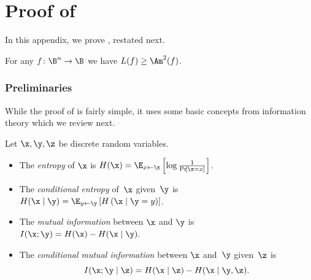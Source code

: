 \documentclass{toc}
\begin{document}
\appendix

\section{\label{sec:L-Am}Proof of }

In this appendix, we prove , restated next. 
\begin{restated}{}
For any $f\colon\B^{n}\to\B$ we have $L(f)\geq\Am^{2}(f)$. 
\end{restated}


\subsubsection*{Preliminaries}

While the proof of  is fairly simple, it uses some basic
concepts from information theory which we review next. 
\begin{definition}
\label{def:information}Let $\x,\y,\z$ be discrete random variables. 
\begin{itemize}
\item The \emph{entropy} of $\x$ is $H(\x)=\E_{x\gets\x}\left[\log\frac{1}{\Pr\!\left[\x=x\right]}\right]$. 
\item The \emph{conditional entropy} of~$\x$ given~$\y$ is $H(\x\mid\y)=\E_{y\gets\y}\left[H\left(\x\mid\y=y\right)\right]$. 
\item The \emph{mutual information} between $\x$ and $\y$ is $I(\x;\y)=H(\x)-H(\x\mid\y).$ 
\item The \emph{conditional mutual information} between $\x$ and~$\y$
given~$\z$ is 
\[
I(\x;\y\mid\z)=H(\x\mid\z)-H(\x\mid\y,\z).
\]
\end{itemize}
\end{definition}
\end{document}
